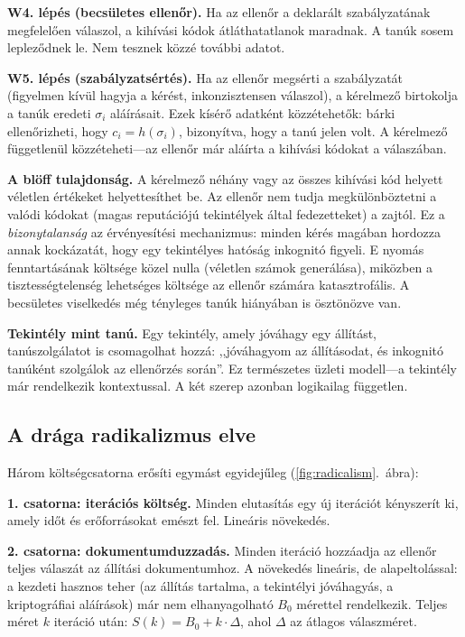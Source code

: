 \documentclass[11pt,a4paper,twocolumn]{article}
\begin{document}
\textbf{W4. lépés (becsületes ellenőr).} Ha az ellenőr a deklarált szabályzatának megfelelően válaszol, a kihívási kódok átláthatatlanok maradnak. A tanúk sosem lepleződnek le. Nem tesznek közzé további adatot.

\textbf{W5. lépés (szabályzatsértés).} Ha az ellenőr megsérti a szabályzatát (figyelmen kívül hagyja a kérést, inkonzisztensen válaszol), a kérelmező birtokolja a tanúk eredeti $\sigma_i$ aláírásait. Ezek kísérő adatként közzétehetők: bárki ellenőrizheti, hogy $c_i = h(\sigma_i)$, bizonyítva, hogy a tanú jelen volt. A kérelmező függetlenül közzéteheti---az ellenőr már aláírta a kihívási kódokat a válaszában.

\textbf{A blöff tulajdonság.} A kérelmező néhány vagy az összes kihívási kód helyett véletlen értékeket helyettesíthet be. Az ellenőr nem tudja megkülönböztetni a valódi kódokat (magas reputációjú tekintélyek által fedezetteket) a zajtól. Ez a \emph{bizonytalanság} az érvényesítési mechanizmus: minden kérés magában hordozza annak kockázatát, hogy egy tekintélyes hatóság inkognitó figyeli. E nyomás fenntartásának költsége közel nulla (véletlen számok generálása), miközben a tisztességtelenség lehetséges költsége az ellenőr számára katasztrofális. A becsületes viselkedés még tényleges tanúk hiányában is ösztönözve van.

\textbf{Tekintély mint tanú.} Egy tekintély, amely jóváhagy egy állítást, tanúszolgálatot is csomagolhat hozzá: ,,jóváhagyom az állításodat, és inkognitó tanúként szolgálok az ellenőrzés során''. Ez természetes üzleti modell---a tekintély már rendelkezik kontextussal. A két szerep azonban logikailag független.

\subsection{A drága radikalizmus elve}

Három költségcsatorna erősíti egymást egyidejűleg (\ref{fig:radicalism}.~ábra):

\textbf{1. csatorna: iterációs költség.} Minden elutasítás egy új iterációt kényszerít ki, amely időt és erőforrásokat emészt fel. Lineáris növekedés.

\textbf{2. csatorna: dokumentumduzzadás.} Minden iteráció hozzáadja az ellenőr teljes válaszát az állítási dokumentumhoz. A növekedés lineáris, de alapeltolással: a kezdeti hasznos teher (az állítás tartalma, a tekintélyi jóváhagyás, a kriptográfiai aláírások) már nem elhanyagolható $B_0$ mérettel rendelkezik. Teljes méret $k$ iteráció után: $S(k) = B_0 + k \cdot \Delta$, ahol $\Delta$ az átlagos válaszméret.
\end{document}

